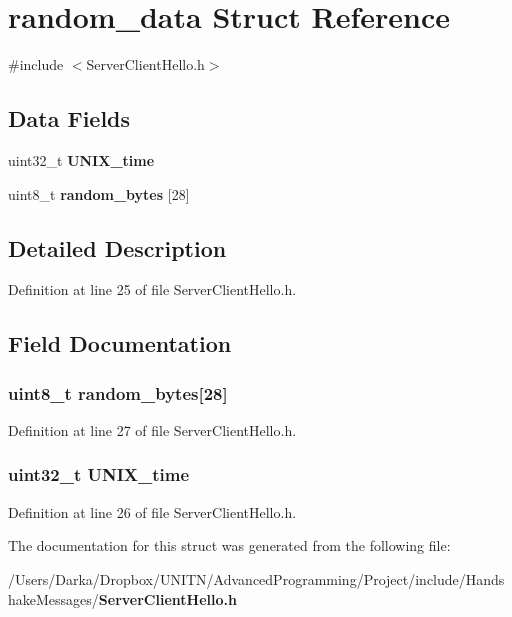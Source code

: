 \section{random\+\_\+data Struct Reference}
\label{structrandom__data}


{\ttfamily \#include $<$Server\+Client\+Hello.\+h$>$}

\subsection*{Data Fields}
\begin{DoxyCompactItemize}
\item 
uint32\+\_\+t {\bf U\+N\+I\+X\+\_\+time}
\item 
uint8\+\_\+t {\bf random\+\_\+bytes} [28]
\end{DoxyCompactItemize}


\subsection{Detailed Description}


Definition at line 25 of file Server\+Client\+Hello.\+h.



\subsection{Field Documentation}
\subsubsection[{random\+\_\+bytes}]{\setlength{\rightskip}{0pt plus 5cm}uint8\+\_\+t random\+\_\+bytes[28]}\label{structrandom__data_a179340bb108f00eb9461163551bb9051}


Definition at line 27 of file Server\+Client\+Hello.\+h.

\subsubsection[{U\+N\+I\+X\+\_\+time}]{\setlength{\rightskip}{0pt plus 5cm}uint32\+\_\+t U\+N\+I\+X\+\_\+time}\label{structrandom__data_a905c3cf8e7be80f2a3255f99c3ee2fb4}


Definition at line 26 of file Server\+Client\+Hello.\+h.



The documentation for this struct was generated from the following file\+:\begin{DoxyCompactItemize}
\item 
/\+Users/\+Darka/\+Dropbox/\+U\+N\+I\+T\+N/\+Advanced\+Programming/\+Project/include/\+Handshake\+Messages/{\bf Server\+Client\+Hello.\+h}\end{DoxyCompactItemize}
